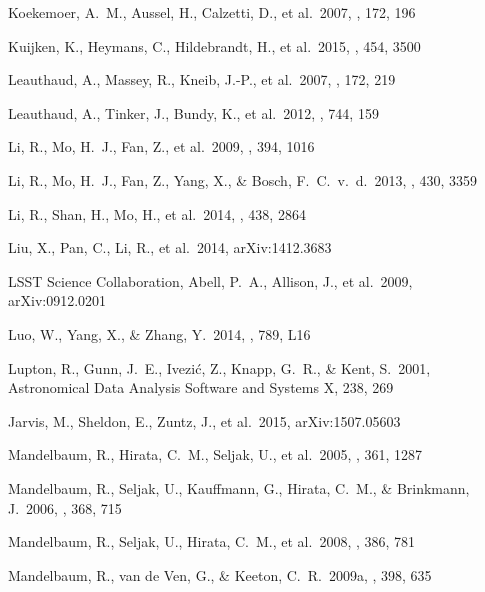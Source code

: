 \documentclass[apj]{emulateapj}
\begin{document}
\begin{thebibliography}{}
 Koekemoer, A.~M.,
Aussel, H., Calzetti, D., et al.\ 2007, \apjs, 172, 196

 Kuijken, K., Heymans, 
C., Hildebrandt, H., et al.\ 2015, \mnras, 454, 3500 


 Leauthaud, A.,
Massey, R., Kneib, J.-P., et al.\ 2007, \apjs, 172, 219


  Leauthaud, A.,
  Tinker, J., Bundy, K., et al.\ 2012, \apj, 744, 159

  Li, R., Mo, H.~J., Fan, Z.,
  et al.\ 2009, \mnras, 394, 1016

  Li, R., Mo, H.~J., Fan, Z.,
Yang, X., \& Bosch, F.~C.~v.~d.\ 2013, \mnras, 430, 3359


  Li, R., Shan, H., Mo, H., et
  al.\ 2014, \mnras, 438, 2864


  Liu, X., Pan, C., Li, R.,
  et al.\ 2014, arXiv:1412.3683
  
   LSST 
Science Collaboration, Abell, P.~A., Allison, J., et al.\ 2009, 
arXiv:0912.0201 


 Luo, W., Yang, X.,
\& Zhang, Y.\ 2014, \apjl, 789, L16


  Lupton, R., Gunn, J.~E.,
Ivezi{\'c}, Z., Knapp, G.~R.,
\& Kent, S.\ 2001, Astronomical Data Analysis Software and Systems X, 238, 269

 Jarvis, M., Sheldon, E., 
Zuntz, J., et al.\ 2015, arXiv:1507.05603 


  Mandelbaum, R.,
  Hirata, C.~M., Seljak, U., et al.\ 2005, \mnras, 361, 1287


 Mandelbaum, R.,
  Seljak, U., Kauffmann, G., Hirata, C.~M., \& Brinkmann, J.\ 2006,
  \mnras, 368, 715


  Mandelbaum, R.,
  Seljak, U., Hirata, C.~M., et al.\ 2008, \mnras, 386, 781

  Mandelbaum, R., van
  de Ven, G., \& Keeton, C.~R.\ 2009a, \mnras, 398, 635



\end{thebibliography}
\end{document}
